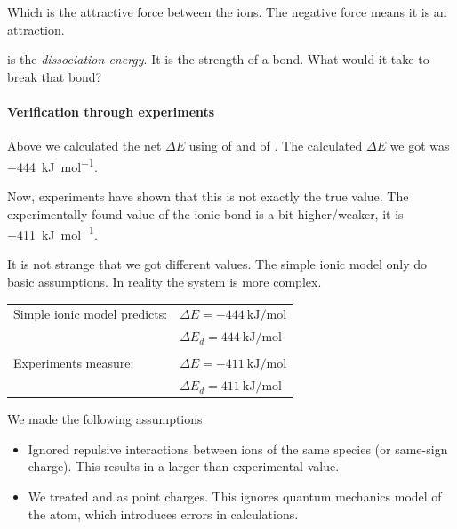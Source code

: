 \documentclass[../mit-general-chemistry.tex]{subfiles}
\begin{document}
Which is the attractive force between the ions. The negative force
means it is an attraction.



\begin{remark}
  \dissociationenergy is the {\em dissociation energy}. It is the
  strength of a bond. What would it take to break that bond?
\end{remark}




\paragraph{Verification through experiments}
Above we calculated the net $\Delta E$ using \ionizationenergy of
 and \electronaffinity of . The calculated $\Delta E$ we
got was \SI{-444}{\kilo\joule\per\mol}.

Now, experiments have shown that this is not exactly the true
value. The experimentally found value of the  ionic
bond is a bit higher/weaker, it is \SI{-411}{\kilo\joule\per\mol}.

It is not strange that we got different values. The simple ionic model
only do basic assumptions. In reality the system is more complex.

\begin{center}
  \begin{tabular}{ll}
    Simple ionic model predicts:
    & $\Delta E = \SI{-444}{\kilo\joule\per\mol}$ \\
    & $\Delta E_d = \SI{444}{\kilo\joule\per\mol}$ \\
    \\
    Experiments measure:
    & $\Delta E = \SI{-411}{\kilo\joule\per\mol}$ \\
    & $\Delta E_d = \SI{411}{\kilo\joule\per\mol}$ \\
  \end{tabular}
\end{center}



We made the following assumptions
\begin{itemize}
\item Ignored repulsive interactions between ions of the same species
  (or same-sign charge). This results in a larger
  \dissociationenergy than experimental value.
\item We treated  and  as point charges. This ignores
  quantum mechanics model of the atom, which introduces errors in
  calculations.
\end{itemize}
\end{document}

